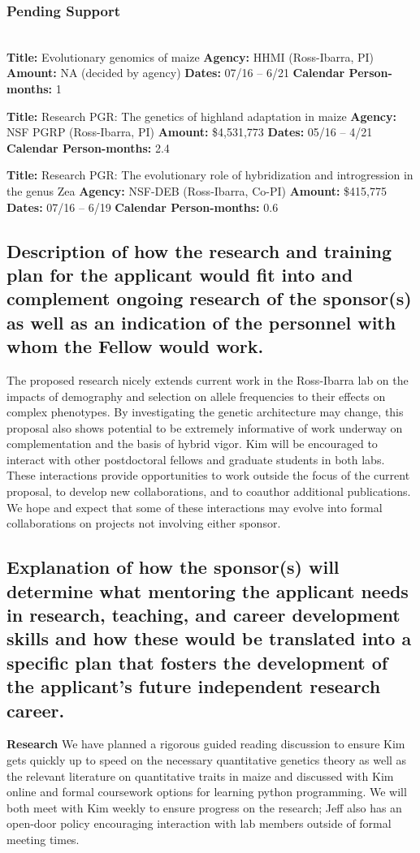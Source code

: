 \subsubsection*{Pending Support}\\ 
\noindent\textbf{Title:} Evolutionary genomics of maize 
\textbf{Agency:} HHMI (Ross-Ibarra, PI)
\textbf{Amount:} NA (decided by agency)
\textbf{Dates:} 07/16 – 6/21
\textbf{Calendar Person-months:} 1

\noindent\textbf{Title:} Research PGR: The genetics of highland adaptation in maize
\textbf{Agency:} NSF PGRP (Ross-Ibarra, PI)
\textbf{Amount:} \$4,531,773
\textbf{Dates:} 05/16 – 4/21
\textbf{Calendar Person-months:} 2.4

\noindent\textbf{Title:} Research PGR: The evolutionary role of hybridization and introgression in the genus Zea
\textbf{Agency:} NSF-DEB (Ross-Ibarra, Co-PI)
\textbf{Amount:} \$415,775
\textbf{Dates:} 07/16 – 6/19
\textbf{Calendar Person-months:} 0.6

\subsection{Description of how the research and training plan for the applicant would fit into and complement ongoing research of the sponsor(s) as well as an indication of the personnel with whom the Fellow would work.}

The proposed research nicely extends current work in the Ross-Ibarra lab on the impacts of demography and selection on allele frequencies to their effects on complex phenotypes. By investigating the genetic architecture may change, this proposal also shows potential to be extremely informative of work underway on complementation and the basis of hybrid vigor.  
Kim will be encouraged to interact with other postdoctoral fellows and graduate students in both labs.  These interactions provide opportunities to work outside the focus of the current proposal, to develop new collaborations, and to coauthor additional publications.  We hope and expect that some of these interactions may evolve into formal collaborations on projects not involving either sponsor.  

\subsection{Explanation of how the sponsor(s) will determine what mentoring the applicant needs in research, teaching, and career development skills and how these would be translated into a specific plan that fosters the development of the applicant's future independent research career.}
\textbf{Research} We have planned a rigorous guided reading discussion to ensure Kim gets quickly up to speed on the necessary quantitative genetics theory as well as the relevant literature on quantitative traits in maize and discussed with Kim online and formal coursework options for learning python programming. We will both meet with Kim weekly to ensure progress on the research; Jeff also has an open-door policy encouraging interaction with lab members outside of formal meeting times. 

